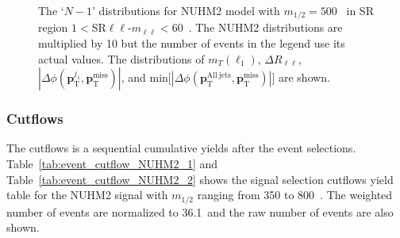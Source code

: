 \begin{figure}[htbp]
    \caption{The `$N-1$' distributions for NUHM2 model with $m_{1/2} = 500$~{\GeV} in SR region $1 < $SR$\ell \ell$-$m_{\ell \ell} < 60$~{\GeV}.
    The NUHM2 distributions are multiplied by 10 but the number of events in the legend use its actual values.
    The distributions of $m_{T}(\ell_{1})$, $\Delta R_{\ell \ell}$, $|\Delta \phi(\mathbf{p}_\mathrm{T}^{j_{1}}, \mathbf{p}_\mathrm{T}^\mathrm{miss})|$, and min[$|\Delta \phi(\mathbf{p}_\mathrm{T}^\mathrm{All\ jets}, \mathbf{p}_\mathrm{T}^\mathrm{miss})|$] are shown.}
    \label{fig:event_nuhm2_kinematic_in_SR_SFOS_3}
\end{figure}


\subsubsection{Cutflows}
\label{subsubsec:event_cutflows}
The cutflows is a sequential cumulative yields after the event selections.
Table~\ref{tab:event_cutflow_NUHM2_1} and Table~\ref{tab:event_cutflow_NUHM2_2} shows the signal selection cutflows yield table for the NUHM2 signal with $m_{1/2}$ ranging from 350 to 800~{\GeV}.
The weighted number of events are normalized to 36.1~\ifb and the raw number of events are also shown.

